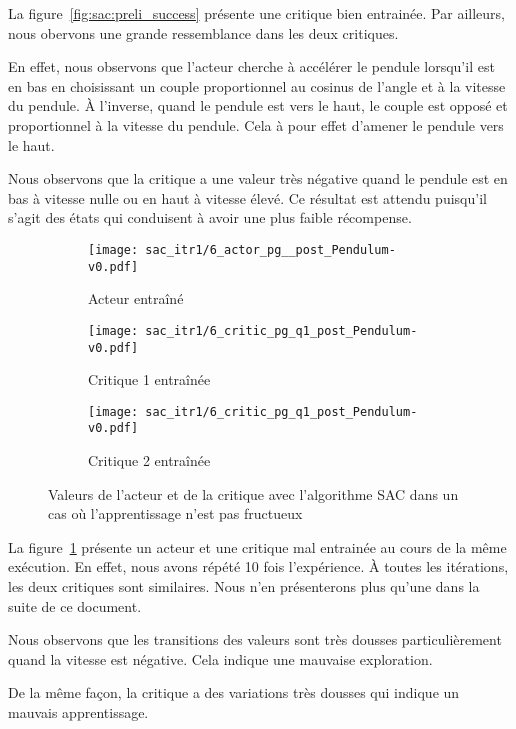 La figure~\ref{fig:sac:preli_success} présente une critique bien entrainée. Par
ailleurs, nous obervons une grande ressemblance dans les deux critiques.

En effet, nous observons que l'acteur cherche à accélérer le pendule lorsqu'il
est en bas en choisissant un couple proportionnel au cosinus de l'angle et à la
vitesse du pendule. À l'inverse, quand le pendule est vers le haut, le couple
est opposé et proportionnel à la vitesse du pendule. Cela à pour effet d'amener
le pendule vers le haut.

Nous observons que la critique a une valeur très négative quand le pendule est
en bas à vitesse nulle ou en haut à vitesse élevé. Ce résultat est attendu
puisqu'il s'agit des états qui conduisent à avoir une plus faible récompense.

\begin{figure}[H]
    \centering
    \begin{subfigure}{0.3\textwidth}
        \texttt{[image: sac\_itr1/6\_actor\_pg\_\_post\_Pendulum-v0.pdf]}
        \caption{Acteur entraîné}
    \end{subfigure}
    \begin{subfigure}{0.3\textwidth}
        \texttt{[image: sac\_itr1/6\_critic\_pg\_q1\_post\_Pendulum-v0.pdf]}
        \caption{Critique 1 entraînée}
    \end{subfigure}
    \begin{subfigure}{0.3\textwidth}
        \texttt{[image: sac\_itr1/6\_critic\_pg\_q1\_post\_Pendulum-v0.pdf]}
        \caption{Critique 2 entraînée}
    \end{subfigure}
    \caption{Valeurs de l'acteur et de la critique avec l'algorithme SAC dans un cas où l'apprentissage n'est pas fructueux}\label{fig:sac:preli_failed}
\end{figure}

La figure~\ref{fig:sac:preli_failed} présente un acteur et une critique mal
entrainée au cours de la même exécution. En effet, nous avons répété 10 fois
l'expérience. À toutes les itérations, les deux critiques sont similaires. Nous
n'en présenterons plus qu'une dans la suite de ce document.

Nous observons que les transitions des valeurs sont très dousses
particulièrement quand la vitesse est négative. Cela indique une mauvaise
exploration.

De la même façon, la critique a des variations très dousses qui indique un
mauvais apprentissage.

